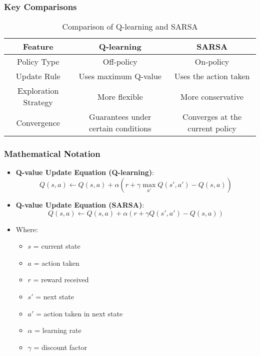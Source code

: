 \documentclass[aspectratio=169]{beamer}
\begin{document}
\begin{frame}[fragile]
    \frametitle{Key Comparisons}
    \begin{table}[ht]
        \centering
        \begin{tabular}{|c|c|c|}
            \hline
            \textbf{Feature} & \textbf{Q-learning} & \textbf{SARSA} \\
            \hline
            Policy Type & Off-policy & On-policy \\
            \hline
            Update Rule & Uses maximum Q-value & Uses the action taken \\
            \hline
            Exploration Strategy & More flexible & More conservative \\
            \hline
            Convergence & Guarantees under certain conditions & Converges at the current policy \\
            \hline
        \end{tabular}
        \caption{Comparison of Q-learning and SARSA}
    \end{table}
\end{frame}

\begin{frame}[fragile]
    \frametitle{Mathematical Notation}
    \begin{itemize}
        \item \textbf{Q-value Update Equation (Q-learning)}:
        \begin{equation}
            Q(s, a) \leftarrow Q(s, a) + \alpha \left( r + \gamma \max_{a'} Q(s', a') - Q(s, a) \right)
        \end{equation}
        
        \item \textbf{Q-value Update Equation (SARSA)}:
        \begin{equation}
            Q(s, a) \leftarrow Q(s, a) + \alpha \left( r + \gamma Q(s', a') - Q(s, a) \right)
        \end{equation}

        \item Where:
        \begin{itemize}
            \item $s$ = current state
            \item $a$ = action taken
            \item $r$ = reward received
            \item $s'$ = next state
            \item $a'$ = action taken in next state
            \item $\alpha$ = learning rate
            \item $\gamma$ = discount factor
        \end{itemize}
    \end{itemize}
\end{frame}
\end{document}
